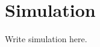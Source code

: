 \documentclass[a4paper,11pt,oneside,openany,fleqn]{jsbook}
\begin{document}
    \chapter{Simulation}
        Write simulation here.
\end{document}
